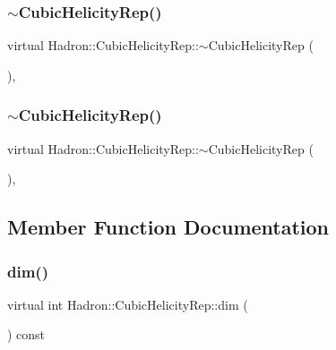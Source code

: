\subsubsection{\texorpdfstring{$\sim$CubicHelicityRep()}{~CubicHelicityRep()}\hspace{0.1cm}{\footnotesize\ttfamily [2/3]}}
{\footnotesize\ttfamily virtual Hadron\+::\+Cubic\+Helicity\+Rep\+::$\sim$\+Cubic\+Helicity\+Rep (\begin{DoxyParamCaption}{ }\end{DoxyParamCaption})\hspace{0.3cm}{\ttfamily [inline]}, {\ttfamily [virtual]}}

\mbox{\label{structHadron_1_1CubicHelicityRep_a8ac31a49aff79450f4505e20fc8b6b15}} 
\subsubsection{\texorpdfstring{$\sim$CubicHelicityRep()}{~CubicHelicityRep()}\hspace{0.1cm}{\footnotesize\ttfamily [3/3]}}
{\footnotesize\ttfamily virtual Hadron\+::\+Cubic\+Helicity\+Rep\+::$\sim$\+Cubic\+Helicity\+Rep (\begin{DoxyParamCaption}{ }\end{DoxyParamCaption})\hspace{0.3cm}{\ttfamily [inline]}, {\ttfamily [virtual]}}



\subsection{Member Function Documentation}
\mbox{\label{structHadron_1_1CubicHelicityRep_a95d229a05580e65f8bdde74a1e316855}} 
\subsubsection{\texorpdfstring{dim()}{dim()}\hspace{0.1cm}{\footnotesize\ttfamily [1/3]}}
{\footnotesize\ttfamily virtual int Hadron\+::\+Cubic\+Helicity\+Rep\+::dim (\begin{DoxyParamCaption}{ }\end{DoxyParamCaption}) const\hspace{0.3cm}{\ttfamily [pure virtual]}}

